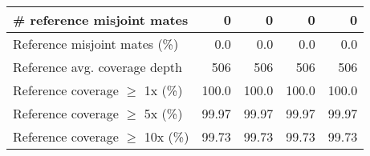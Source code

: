 \documentclass[12pt,a4paper]{article}
\begin{document}
\begin{table}[ht]
\begin{center}
\begin{tabular}{|l*{4}{|r}|}
\# reference misjoint mates & 0 & 0 & 0 & 0 \\ \hline
Reference misjoint mates (\%) & 0.0 & 0.0 & 0.0 & 0.0 \\ \hline
Reference avg. coverage depth & 506 & 506 & 506 & 506 \\ \hline
Reference coverage $\geq$ 1x (\%) & 100.0 & 100.0 & 100.0 & 100.0 \\ \hline
Reference coverage $\geq$ 5x (\%) & 99.97 & 99.97 & 99.97 & 99.97 \\ \hline
Reference coverage $\geq$ 10x (\%) & 99.73 & 99.73 & 99.73 & 99.73 \\ \hline
\end{tabular}
\end{center}
\end{table}
\end{document}
